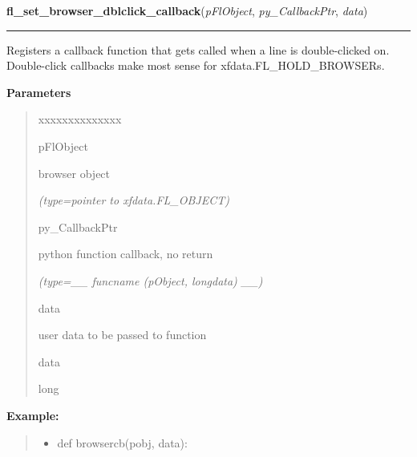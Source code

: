     \vspace{0.5ex}

\hspace{.8\funcindent}\begin{boxedminipage}{\funcwidth}

    \raggedright \textbf{fl\_set\_browser\_dblclick\_callback}(\textit{pFlObject}, \textit{py\_CallbackPtr}, \textit{data})

    \vspace{-1.5ex}

    \rule{\textwidth}{0.5\fboxrule}
\setlength{\parskip}{2ex}
    Registers a callback function that gets called when a line is 
    double-clicked on. Double-click callbacks make most sense for 
    xfdata.FL\_HOLD\_BROWSERs.

\setlength{\parskip}{1ex}
      \textbf{Parameters}
      \vspace{-1ex}

      \begin{quote}
        \begin{Ventry}{xxxxxxxxxxxxxx}

          \item[pFlObject]

          browser object

            {\it (type=pointer to xfdata.FL\_OBJECT)}

          \item[py\_CallbackPtr]

          python function callback, no return

            {\it (type=\_\_ funcname (pObject, longdata) \_\_)}

          \item[data]

          user data to be passed to function

          \item[data]

          long

        \end{Ventry}

      \end{quote}

\textbf{Example:}
\begin{quote}
  \begin{itemize}

  \item
    \setlength{\parskip}{0.6ex}
def browsercb(pobj, data):




\end{itemize}
\end{quote}
\end{boxedminipage}
